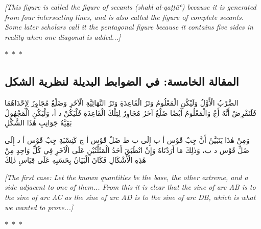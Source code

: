 \documentclass[11pt,a4paper]{article}
\theoremstyle{plain}
\theoremstyle{definition}
\theoremstyle{remark}
\newcommand{\ar}[1]{{\arabicfont\beginR #1\endR}}
\newcommand{\ornament}{\begin{center}\textcolor{goldaccent}{$\ast$~$\ast$~$\ast$}\end{center}}
\begin{document}
\vspace{0.3cm}

\noindent\noindent\textcolor{notecolor}{\textit{[This figure is called the figure of secants (shakl al-qaṭṭāʿ) because it is generated from four intersecting lines, and is also called the figure of complete secants. Some later scholars call it the pentagonal figure because it contains five sides in reality when one diagonal is added...]}}



\ornament



\subsection*{\ar{المقالة الخامسة: في الضوابط البديلة لنظرية الشكل}}




\ar{الضَّرْبُ الْأَوَّلُ وَلَيْكُنِ الْمَعْلُومُ وَتَرُ الْقَاعِدَةِ وَتَرُ النَّهَائِيَّةِ الْآخَرِ وَضَلْعٌ مُجَاوِرٌ لِإِحْدَاهُمَا فَلَنَفْرِضْ أَنَّهُ أَجْ وَالْمَعْلُومُ أَيْضًا ضَلْعٌ آخَرُ مُجَاوِرٌ لِتِلْكَ الْقَاعِدَةِ فَلْيَكُنْ د أ، وَلْيَكُنِ الْمَجْهُولُ بَقِيَّةُ جَوَانِبِ هٰذَا الشَّكْلِ



وَمِنْ هٰذَا يَتَبَيَّنُ أَنَّ جِبْ قَوْس أ ب إِلَى ب ط ضَلْ قَوْس أ ج كَنِسْبَةِ جِبْ قَوْس أ د إِلَى ضَلِّ قَوْس د ب، وَذٰلِكَ مَا أَرَدْنَاهُ وَإِنْ انْطَبَقَ أَحَدُ الْمَثَلَّثَيْنِ عَلَى الْآخَرِ فِي كُلِّ وَاحِدٍ مِنْ هٰذِهِ الْأَشْكَالِ فَكَانَ الْبَيَانُ بِحَسَبِهِ عَلَى قِيَاسِ ذٰلِكَ}



\vspace{0.3cm}

\noindent\textcolor{notecolor}{\textit{[The first case: Let the known quantities be the base, the other extreme, and a side adjacent to one of them... From this it is clear that the sine of arc AB is to the sine of arc AC as the sine of arc AD is to the sine of arc DB, which is what we wanted to prove...]}}



\ornament





\end{document}

